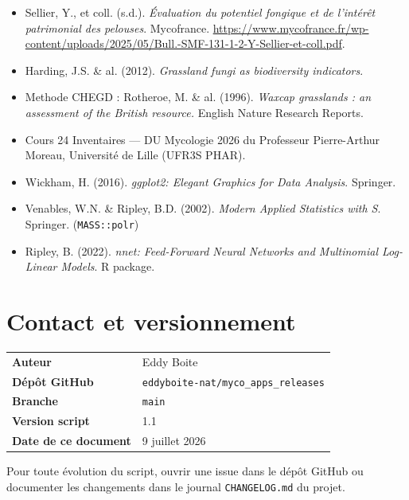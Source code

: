 \documentclass[11pt,a4paper]{article}
\begin{document}
\begin{itemize}
  \item Sellier, Y., et coll. (s.d.). \textit{Évaluation du potentiel fongique et de l'intérêt patrimonial des pelouses}. Mycofrance. \url{https://www.mycofrance.fr/wp-content/uploads/2025/05/Bull.-SMF-131-1-2-Y-Sellier-et-coll.pdf}.
  \item Harding, J.S. \& al. (2012). \textit{Grassland fungi as biodiversity indicators}.
  \item Methode CHEGD : Rotheroe, M. \& al. (1996). \textit{Waxcap grasslands : an assessment of the British resource.} English Nature Research Reports.
  \item Cours 24 Inventaires — DU Mycologie 2026 du Professeur Pierre-Arthur Moreau, Université de Lille (UFR3S PHAR).
  \item Wickham, H. (2016). \textit{ggplot2: Elegant Graphics for Data Analysis}. Springer.
  \item Venables, W.N. \& Ripley, B.D. (2002). \textit{Modern Applied Statistics with S}. Springer. (\texttt{MASS::polr})
  \item Ripley, B. (2022). \textit{nnet: Feed-Forward Neural Networks and Multinomial Log-Linear Models}. R package.
\end{itemize}

\section*{Contact et versionnement}

\begin{table}[htbp]
  \centering
  \begin{tabular}{ll}
    \toprule
    \textbf{Auteur}          & Eddy Boite \\
    \textbf{Dépôt GitHub}    & \texttt{eddyboite-nat/myco\_apps\_releases} \\
    \textbf{Branche}         & \texttt{main} \\
    \textbf{Version script}  & 1.1 \\
    \textbf{Date de ce document} & 9 juillet 2026 \\
    \bottomrule
  \end{tabular}
\end{table}

Pour toute évolution du script, ouvrir une issue dans le dépôt GitHub
ou documenter les changements dans le journal \texttt{CHANGELOG.md} du projet.

\end{document}
